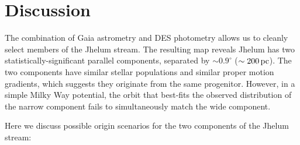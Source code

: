 \documentclass[twocolumn]{aastex62}
\begin{document}
\section{Discussion}
\label{sec:discussion}
The combination of Gaia astrometry and DES photometry allows us to cleanly select members of the Jhelum stream.
The resulting map reveals Jhelum has two statistically-significant parallel components, separated by $\sim0.9^\circ$ ($\sim200\,\rm pc$).
The two components have similar stellar populations and similar proper motion gradients, which suggests they originate from the same progenitor.
However, in a simple Milky Way potential, the orbit that best-fits the observed distribution of the narrow component fails to simultaneously match the wide component.

Here we discuss possible origin scenarios for the two components of the Jhelum stream:
\end{document}
